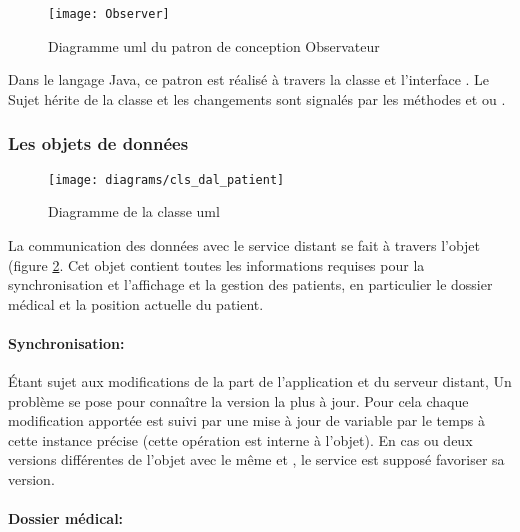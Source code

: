 \begin{figure}[H]
\center
\texttt{[image: Observer]}
\caption{Diagramme \gls{uml} du patron de conception Observateur~\cite{wikipedia:observer}}
\label{fig:observer}
\end{figure}

Dans le langage Java, ce patron est réalisé à travers la classe  et l'interface . Le Sujet hérite de la classe  et les changements sont signalés par les méthodes  et  ou .

\subsubsection{Les objets de données}

\begin{figure}
\center
\texttt{[image: diagrams/cls\_dal\_patient]}
\caption{Diagramme de la classe \gls{uml}  }
\label{fig:cls_dal_patient}
\end{figure}

La communication des données avec le service distant se fait à travers l'objet  (figure \ref{fig:cls_dal_patient}. Cet objet contient toutes les informations requises pour la synchronisation et l'affichage et la gestion des patients, en particulier le dossier médical et la position actuelle du patient.

\paragraph{Synchronisation:}

Étant sujet aux modifications de la part de l'application et du serveur distant, Un problème se pose pour connaître la version la plus à jour. Pour cela chaque modification apportée est suivi par une mise à jour de variable  par le temps à cette instance précise (cette opération est interne à l'objet). En cas ou deux versions différentes de l'objet  avec le même  et , le service est supposé favoriser sa version.

\paragraph{Dossier médical:}

